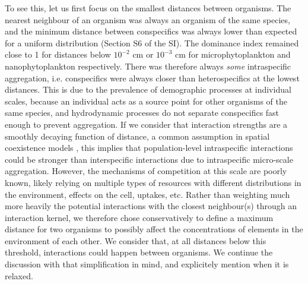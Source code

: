 \documentclass[english]{article}
\begin{document}
To see this, let us first focus on the smallest distances between
organisms. The nearest neighbour of an organism was always an organism
of the same species, and the minimum distance between conspecifics
was always lower than expected for a uniform distribution (Section
S6 of the SI). The dominance index remained close to 1 for distances
below $10^{-2}$ cm or $10^{-3}$ cm for microphytoplankton and nanophytoplankton
respectively. There was therefore always \emph{some} intraspecific
aggregation, i.e. conspecifics were always closer than heterospecifics
at the lowest distances. This is due to the prevalence of demographic
processes at individual scales, because an individual acts as a source
point for other organisms of the same species, and hydrodynamic processes
do not separate conspecifics fast enough to prevent aggregation. If
we consider that interaction strengths are a smoothly decaying function
of distance, a common assumption in spatial coexistence models \citep[e.g., ][]{bolker_spatial_1999,law_population_2003},
this implies that population-level intraspecific interactions could
be stronger than interspecific interactions due to intraspecific micro-scale
aggregation. However, the mechanisms of competition at this scale
are poorly known, likely relying on multiple types of resources with
different distributions in the environment, effects on the cell, uptakes,
etc. Rather than weighting much more heavily the potential interactions
with the closest neighbour(s) through an interaction kernel, we therefore
chose conservatively to define a maximum distance for two organisms
to possibly affect the concentrations of elements in the environment
of each other. We consider that, at all distances below this threshold,
interactions could happen between organisms. We continue the discussion
with that simplification in mind, and explicitely mention when it
is relaxed.
\end{document}

